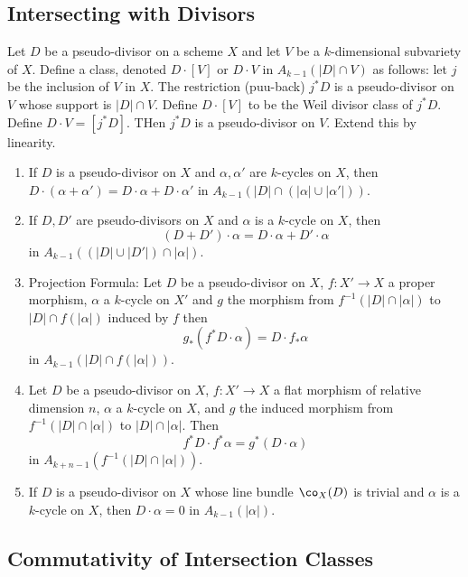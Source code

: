 \subsection{Intersecting with Divisors}


\begin{dfn}
Let $D$ be a pseudo-divisor on a scheme $X$ and let $V$ be a $k$-dimensional subvariety of $X$. Define a class, denoted $D \cdot [V]$ or $D \cdot V$ in $A_{k-1}(|D| \cap V)$ as follows: let $j$ be the inclusion of $V$ in $X$. The restriction (puu-back) $j^*D$ is a pseudo-divisor on $V$ whose support is $|D| \cap V$. Define $D \cdot [V]$ to be the Weil divisor class of $j^*D$. Define $D \cdot V=[j^*D]$. THen $j^*D$ is a pseudo-divisor on $V$. Extend this by linearity.
\end{dfn}


\begin{prop} \hfill
\begin{enumerate}
\item If $D$ is a pseudo-divisor on $X$ and $\alpha,\alpha'$ are $k$-cycles on $X$, then $D\cdot(\alpha + \alpha')=D \cdot \alpha + D \cdot \alpha'$ in $A_{k-1}(|D| \cap (|\alpha| \cup |\alpha'|))$.
\item If $D,D'$ are pseudo-divisors on $X$ and $\alpha$ is a $k$-cycle on $X$, then 
	\[
	(D+D') \cdot \alpha = D\cdot \alpha + D' \cdot \alpha
	\]
in $A_{k-1}((|D| \cup |D'|) \cap |\alpha|)$.
\item Projection Formula: Let $D$ be a pseudo-divisor on $X$, $f: X' \to X$ a proper morphism, $\alpha$ a $k$-cycle on $X'$ and $g$ the morphism from $f^{-1}(|D| \cap |\alpha|)$ to $|D| \cap f(|\alpha|)$ induced by $f$ then
	\[
	g_*(f^*D \cdot \alpha)= D \cdot f_*\alpha
	\]
in $A_{k-1}(|D| \cap f(|\alpha|))$. 
\item Let $D$ be a pseudo-divisor on $X$, $f: X' \to X$ a flat morphism of relative dimension $n$, $\alpha$ a $k$-cycle on $X$, and $g$ the induced morphism from $f^{-1}(|D| \cap |\alpha|)$ to $|D| \cap |\alpha|$. Then 
	\[
	f^*D \cdot f^*\alpha = g^*(D \cdot \alpha)
	\]
in $A_{k+n-1}(f^{-1}(|D| \cap |\alpha|))$.
\item If $D$ is a pseudo-divisor on $X$ whose line bundle $\co_X(D)$ is trivial and $\alpha$ is a $k$-cycle on $X$, then $D \cdot \alpha = 0$ in $A_{k-1}(|\alpha|)$.
\end{enumerate}
\end{prop}


\subsection{Commutativity of Intersection Classes}



